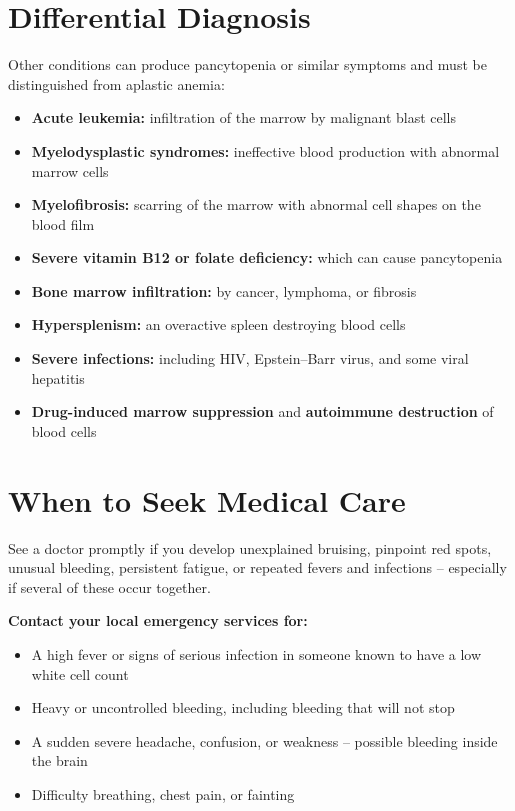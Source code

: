 \section*{Differential Diagnosis}
Other conditions can produce pancytopenia or similar symptoms and must be distinguished from aplastic anemia:

\begin{itemize}
    \item \textbf{Acute leukemia:} infiltration of the marrow by malignant blast cells
    \item \textbf{Myelodysplastic syndromes:} ineffective blood production with abnormal marrow cells
    \item \textbf{Myelofibrosis:} scarring of the marrow with abnormal cell shapes on the blood film
    \item \textbf{Severe vitamin B12 or folate deficiency:} which can cause pancytopenia
    \item \textbf{Bone marrow infiltration:} by cancer, lymphoma, or fibrosis
    \item \textbf{Hypersplenism:} an overactive spleen destroying blood cells
    \item \textbf{Severe infections:} including HIV, Epstein--Barr virus, and some viral hepatitis
    \item \textbf{Drug-induced marrow suppression} and \textbf{autoimmune destruction} of blood cells
\end{itemize}

\section*{When to Seek Medical Care}
See a doctor promptly if you develop unexplained bruising, pinpoint red spots, unusual bleeding, persistent fatigue, or repeated fevers and infections -- especially if several of these occur together.

\textbf{Contact your local emergency services for:}
\begin{itemize}
    \item A high fever or signs of serious infection in someone known to have a low white cell count
    \item Heavy or uncontrolled bleeding, including bleeding that will not stop
    \item A sudden severe headache, confusion, or weakness -- possible bleeding inside the brain
    \item Difficulty breathing, chest pain, or fainting
\end{itemize}

